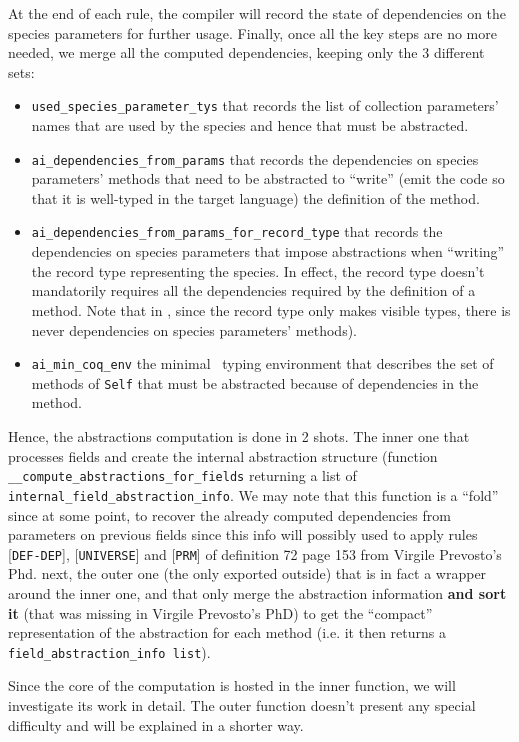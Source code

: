 At the end of each rule, the compiler will record the state of
dependencies on the species parameters for further usage. Finally,
once all the key steps are no more needed, we merge all the
computed dependencies, keeping only the 3 different sets:
\begin{itemize}
\item {\tt used\_species\_parameter\_tys} that records the list of
  collection parameters' names that are used by the species and hence
  that must be abstracted.
\item {\tt ai\_dependencies\_from\_params} that records the dependencies
  on species parameters' methods that need to be abstracted to
  ``write'' (emit the code so that it is well-typed in the target
  language) the definition of the method.
\item {\tt ai\_dependencies\_from\_params\_for\_record\_type} that
  records the dependencies on species parameters that impose
  abstractions when ``writing'' the record type representing the
  species. In effect, the record type doesn't mandatorily requires all
  the dependencies required by the definition of a method. Note that
  in \ocaml, since the record type only makes visible types, there is
  never dependencies on species parameters' methods).
\item {\tt ai\_min\_coq\_env} the minimal \coq\ typing environment that
  describes the set of methods of {\tt Self} that must be abstracted
  because of dependencies in the method.
\end{itemize}


Hence, the abstractions computation is done in 2 shots. The inner one
that processes fields and create the internal abstraction structure
(function {\tt \_\_compute\_abstractions\_for\_fields} returning a
list of {\tt internal\_field\_abstraction\_info}. We may note that
this function is a ``fold'' since at some point, to recover the
already computed dependencies from parameters on previous fields since
this info will possibly used to apply rules [{\tt DEF-DEP}],
[{\tt UNIVERSE}] and [{\tt PRM}] of definition 72 page 153 from
Virgile Prevosto's Phd. next, the outer one (the only exported
outside) that is in fact a wrapper around the inner one, and that only 
merge the abstraction information {\bf and sort it} (that was missing
in Virgile Prevosto's PhD) to get the ``compact'' representation of
the abstraction for each method (i.e. it then returns a
{\tt field\_abstraction\_info list}).

Since the core of the computation is hosted in the inner function, we
will investigate its work in detail. The outer function doesn't
present any special difficulty and will be explained in a shorter way.


